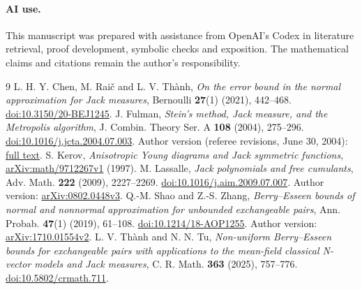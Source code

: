 \documentclass[11pt]{article}
\begin{document}
\paragraph{AI use.}
This manuscript was prepared with assistance from OpenAI's Codex in
literature retrieval, proof development, symbolic checks and exposition.
The mathematical claims and citations remain the author's responsibility.

\begin{thebibliography}{9}
L. H. Y. Chen, M. Rai\v c and L. V. Th\`anh,
\emph{On the error bound in the normal approximation for Jack measures},
Bernoulli \textbf{27}(1) (2021), 442--468.
\href{https://doi.org/10.3150/20-BEJ1245}{doi:10.3150/20-BEJ1245}.
J. Fulman, \emph{Stein's method, Jack measure, and the Metropolis algorithm},
J. Combin. Theory Ser. A \textbf{108} (2004), 275--296.
\href{https://doi.org/10.1016/j.jcta.2004.07.003}{doi:10.1016/j.jcta.2004.07.003}.
Author version (referee revisions, June 30, 2004):
\href{https://dornsife.usc.edu/jason-fulman/wp-content/uploads/sites/224/2023/06/steinjackfinal6.pdf}{full text}.
S. Kerov, \emph{Anisotropic Young diagrams and Jack symmetric functions},
\href{https://arxiv.org/abs/math/9712267v1}{arXiv:math/9712267v1} (1997).
M. Lassalle, \emph{Jack polynomials and free cumulants},
Adv. Math. \textbf{222} (2009), 2227--2269.
\href{https://doi.org/10.1016/j.aim.2009.07.007}{doi:10.1016/j.aim.2009.07.007}.
Author version: \href{https://arxiv.org/abs/0802.0448v3}{arXiv:0802.0448v3}.
Q.-M. Shao and Z.-S. Zhang,
\emph{Berry--Esseen bounds of normal and nonnormal approximation for
unbounded exchangeable pairs}, Ann. Probab. \textbf{47}(1) (2019), 61--108.
\href{https://doi.org/10.1214/18-AOP1255}{doi:10.1214/18-AOP1255}.
Author version: \href{https://arxiv.org/abs/1710.01554v2}{arXiv:1710.01554v2}.
L. V. Th\`anh and N. N. Tu,
\emph{Non-uniform Berry--Esseen bounds for exchangeable pairs with
applications to the mean-field classical N-vector models and Jack measures},
C. R. Math. \textbf{363} (2025), 757--776.
\href{https://doi.org/10.5802/crmath.711}{doi:10.5802/crmath.711}.
\end{thebibliography}
\end{document}
